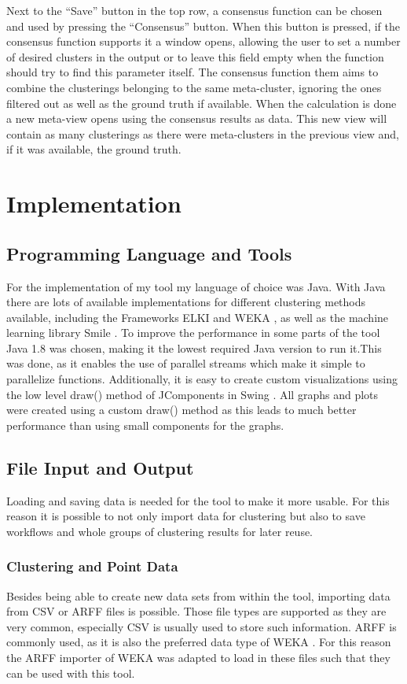 \documentclass[
	a4paper,
	english,
	twoside,
	openright,               
	11pt                            
	]{report}
\begin{document}
Next to the ``Save'' button in the top row, a consensus function can be chosen and used by pressing the ``Consensus'' button. When this button is pressed, if the consensus function supports it a window opens, allowing the user to set a number of desired clusters in the output or to leave this field empty when the function should try to find this parameter itself. The consensus function them aims to combine the clusterings belonging to the same meta-cluster, ignoring the ones filtered out as well as the ground truth if available. When the calculation is done a new meta-view opens using the consensus results as data. This new view will contain as many clusterings as there were meta-clusters in the previous view and, if it was available, the ground truth.

\chapter{Implementation}\label{cha:impl}
\section{Programming Language and Tools}
For the implementation of my tool my language of choice was Java. With Java there are lots of available implementations for different clustering methods available, including the Frameworks ELKI \cite{10.1007/978-3-540-69497-7_41} and WEKA \cite{10.1145/1656274.1656278}, as well as the machine learning library Smile \cite{javasmile}. To improve the performance in some parts of the tool Java 1.8 was chosen, making it the lowest required Java version to run it.This was done, as it enables the use of parallel streams which make it simple to parallelize functions. Additionally, it is easy to create custom visualizations using the low level draw() method of JComponents in Swing \cite{javaswing}. All graphs and plots were created using a custom draw() method as this leads to much better performance than using small components for the graphs.

\section{File Input and Output}
Loading and saving data is needed for the tool to make it more usable. For this reason it is possible to not only import data for clustering but also to save workflows and whole groups of clustering results for later reuse.
\subsection{Clustering and Point Data}
Besides being able to create new data sets from within the tool, importing data from CSV or ARFF files is possible. Those file types are supported as they are very common, especially CSV is usually used to store such information. ARFF is commonly used, as it is also the preferred data type of WEKA \cite{10.1145/1656274.1656278}. For this reason the ARFF importer of WEKA was adapted to load in these files such that they can be used with this tool. 
\end{document}
